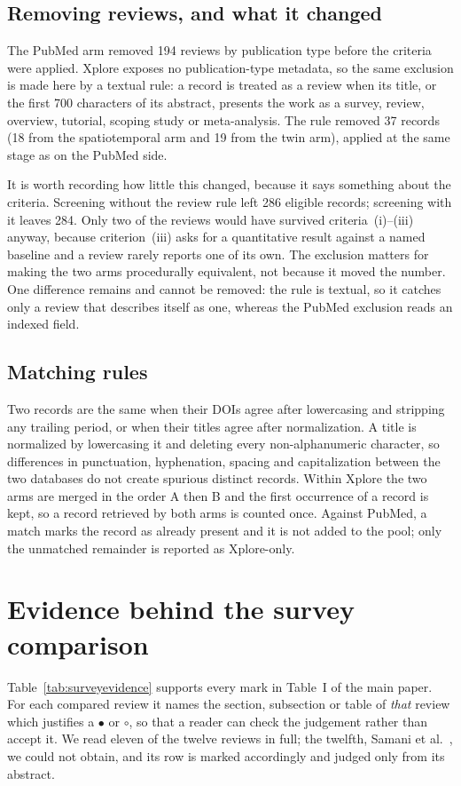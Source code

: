 \documentclass[journal]{IEEEtran}
\begin{document}
\subsection{Removing reviews, and what it changed}
The PubMed arm removed 194 reviews by publication type before the criteria were
applied. Xplore exposes no publication-type metadata, so the same exclusion is made
here by a textual rule: a record is treated as a review when its title, or the first
700 characters of its abstract, presents the work as a survey, review, overview,
tutorial, scoping study or meta-analysis. The rule removed 37 records
(18 from the spatiotemporal arm and 19 from the
twin arm), applied at the same stage as on the PubMed side.

It is worth recording how little this changed, because it says something about the
criteria. Screening without the review rule left 286 eligible records; screening with
it leaves 284. Only two of the reviews would have survived criteria~(i)--(iii)
anyway, because criterion~(iii) asks for a quantitative result against a named
baseline and a review rarely reports one of its own. The exclusion matters for making
the two arms procedurally equivalent, not because it moved the number. One difference
remains and cannot be removed: the rule is textual, so it catches only a review that
describes itself as one, whereas the PubMed exclusion reads an indexed field.

\subsection{Matching rules}
Two records are the same when their DOIs agree after lowercasing and stripping any
trailing period, or when their titles agree after normalization. A title is
normalized by lowercasing it and deleting every non-alphanumeric character, so
differences in punctuation, hyphenation, spacing and capitalization between the two
databases do not create spurious distinct records. Within Xplore the two arms are
merged in the order A then B and the first occurrence of a record is kept, so a
record retrieved by both arms is counted once. Against PubMed, a match marks the
record as already present and it is not added to the pool; only the unmatched
remainder is reported as Xplore-only.

\section{Evidence behind the survey comparison}
\label{sec:surveyevidence}
Table~\ref{tab:surveyevidence} supports every mark in Table~I of the main
paper. For each compared review it names the section, subsection or table of
\emph{that} review which justifies a $\bullet$ or $\circ$, so that a reader can
check the judgement rather than accept it. We read eleven of the twelve reviews
in full; the twelfth, Samani et al.~\cite{samani2026stdl}, we could not obtain,
and its row is marked accordingly and judged only from its abstract.
\end{document}
